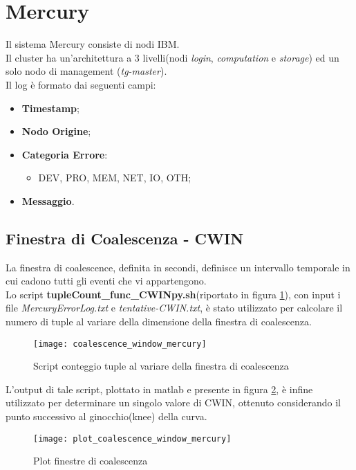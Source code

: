 \clearpage

\section{Mercury}
Il sistema Mercury consiste di nodi IBM.\\
Il cluster ha un'architettura a 3 livelli(nodi \textit{login}, \textit{computation}
e \textit{storage}) ed un solo nodo di management
(\textit{tg-master}).\\
Il log è formato dai seguenti campi:
\begin{itemize}
  \item \textbf{Timestamp};
  \item \textbf{Nodo Origine};
  \item \textbf{Categoria Errore}:
  \begin{itemize}
    \item DEV, PRO, MEM, NET, IO, OTH;
  \end{itemize}
  \item \textbf{Messaggio}.
\end{itemize}

\subsection{Finestra di Coalescenza - CWIN}
La finestra di coalescence, definita in secondi, definisce un intervallo temporale
in cui cadono tutti gli eventi che vi appartengono.\\
Lo script \textbf{tupleCount\_func\_CWINpy.sh}(riportato in figura \ref{coalescence_window_mercury}), con input i file \textit{MercuryErrorLog.txt}
e \textit{tentative-CWIN.txt}, è stato utilizzato per calcolare il numero di tuple al
variare della dimensione della finestra di coalescenza.\\

\begin{figure}[!htbp]
  \texttt{[image: coalescence\_window\_mercury]}
  \caption{Script conteggio tuple al variare della finestra di coalescenza}
  \label{coalescence_window_mercury}
\end{figure}

\clearpage

L'output di tale script, plottato in matlab e presente in figura \ref{plot_coalescence_window_mercury},
è infine utilizzato per determinare un singolo valore di CWIN, ottenuto
considerando il punto successivo al ginocchio(knee) della curva.\\

\begin{figure}[!htbp]
  \texttt{[image: plot\_coalescence\_window\_mercury]}
  \caption{Plot finestre di coalescenza}
  \label{plot_coalescence_window_mercury}
\end{figure}

